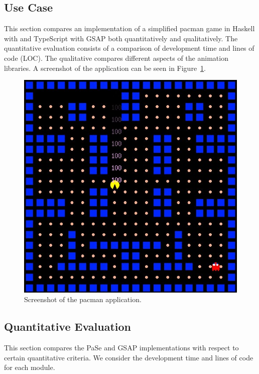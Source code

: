 \subsection{Use Case}

This section compares an implementation of a simplified pacman game in Haskell with \dsl{} and TypeScript with GSAP both quantitatively and qualitatively. The quantitative evaluation consists of a comparison of development time and lines of code (LOC). The qualitative compares different aspects of the animation libraries. A screenshot of the application can be seen in Figure~\ref{fig:pacman}.

\begin{figure}[h]{\textwidth}
\centering
\includegraphics[width=\figscale\textwidth]{pictures/pacman}
\caption{Screenshot of the pacman application.}
\label{fig:pacman}
\end{figure}

\subsection{Quantitative Evaluation}

This section compares the PaSe and GSAP implementations with respect to certain quantitative criteria. We consider the development time and lines of code for each module.

